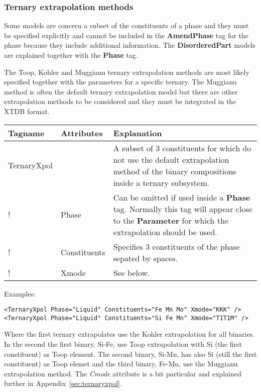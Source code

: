 \documentclass{article}
\begin{document}
\subsubsection{Ternary extrapolation methods}\label{sec:toop}

Some models are concern a subset of the constituents of a phase and
they must be specified explicitly and cannot be included in the {\bf
  AmendPhase} tag for the phase because they include additional
information.  The {\bf DisorderedPart} 
models are explained together with the {\bf Phase} tag.

The Toop, Kohler and Muggianu ternary extrapolation methods are most
likely specified together with the parameters for a specific ternary.
The Muggianu method is often the default ternary extrapolation model
but there are other extrapolation methods to be considered and they
must be integrated in the XTDB format.

\begin{tabular}{|p{} p{} p{}|}\hline
  Tagname& Attributes & Explanation\\\hline

  TernaryXpol & & A subset of 3 constituents for which do not use the default
              extrapolation method of the binary compositions inside
              a ternary subsystem.\\
!       & Phase & Can be omitted if used inside a {\bf Phase} tag.  Normally  
              this tag will appear close to the {\bf Parameter} for which the
              extrapolation should be used.\\
!      & Constituents & Specifies 3 constituents of the phase sepated by
          spaces.\\
!      & Xmode & See below.\\\hline
\end{tabular}

Examples:

\begin{verbatim}
<TernaryXpol Phase="Liquid" Constituents="Fe Mn Mo" Xmode="KKK" />
<TernaryXpol Phase="Liquid" Constituents="Si Fe Mn" Xmode="T1T1M" />
\end{verbatim}

Where the first ternary extrapolates use the Kohler extrapolation for
all binaries.  In the second the first binary, Si-Fe, use Toop
extrapolation with Si (the first constituent) as Toop element.  The
second binary, Si-Mn, has also Si (still the first constituent) as
Toop elemet and the third binary, Fe-Mn, use the Muggianu
extrapolation method.  The {\em Cmode} attribute is a bit particular
and explained further in Appendix~\ref{sec:ternaryxpol}.
\end{document}
